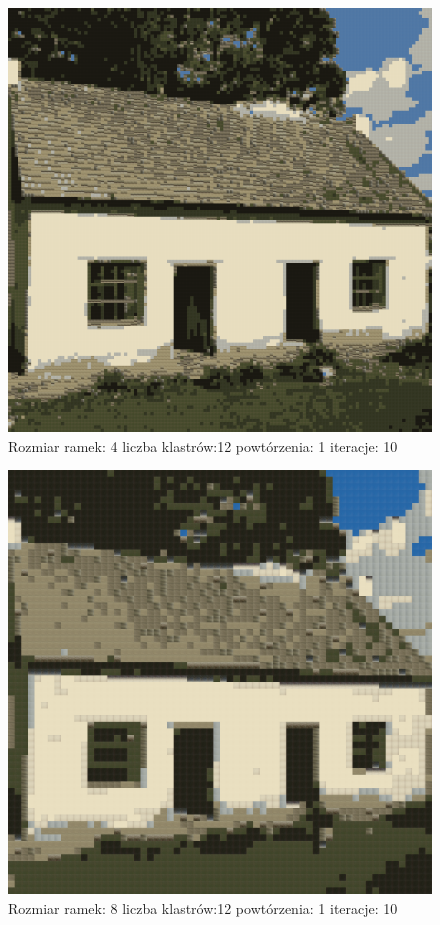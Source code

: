 \documentclass{classrep}
\begin{document}
{{{{\begin{figure}[!htbp]
\centering
\includegraphics[width=\textwidth,width=90mm]{obrazy/house_R4_K12_P1_It10.png}
\caption{Rozmiar ramek: 4 liczba klastrów:12 powtórzenia: 1 iteracje: 10 }
\end{figure}

\begin{figure}[!htbp]
\centering
\includegraphics[width=\textwidth,width=90mm]{obrazy/house_R8_K12_P1_It10.png}
\caption{Rozmiar ramek: 8 liczba klastrów:12 powtórzenia: 1 iteracje: 10 }
\end{figure}

}}}}
\end{document}
